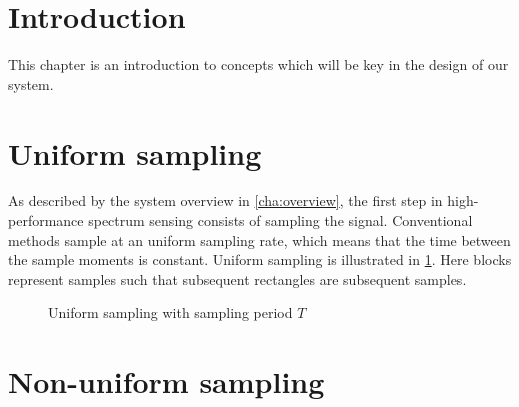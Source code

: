 \documentclass[a4paper, openany, oneside]{memoir}
\begin{document}
\section{Introduction}
This chapter is an introduction to concepts which will be key in the design of our system.
\section{Uniform sampling}
As described by the system overview in \cref{cha:overview}, the first step in high-performance spectrum sensing consists of sampling the signal. Conventional methods sample at an uniform sampling rate, which means that the time between the sample moments is constant. Uniform sampling is illustrated in \cref{tkz:uniform}. Here blocks represent samples such that subsequent rectangles are subsequent samples.

\begin{figure}[H]
\centering
{}
\caption{Uniform sampling with sampling period $T$}\label{tkz:uniform}
\end{figure}

\section{Non-uniform sampling}
\end{document}
